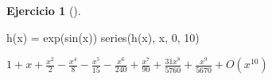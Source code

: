 \documentclass[
  a4paper,
]{scrreport}
\newenvironment{Shaded}{\begin{snugshade}}{\end{snugshade}}
\newcommand{\FloatTok}[1]{\textcolor[rgb]{0.68,0.00,0.00}{#1}}
\newcommand{\FunctionTok}[1]{\textcolor[rgb]{0.28,0.35,0.67}{#1}}
\newcommand{\NormalTok}[1]{\textcolor[rgb]{0.00,0.23,0.31}{#1}}
\newcommand{\OperatorTok}[1]{\textcolor[rgb]{0.37,0.37,0.37}{#1}}
\theoremstyle{definition}
\newtheorem{exercise}{Ejercicio}[chapter]
\theoremstyle{remark}
\begin{document}
\begin{exercise}[]
\begin{tcolorbox}
\begin{Shaded}
\begin{Highlighting}[]
\FunctionTok{h}\NormalTok{(x) }\OperatorTok{=} \FunctionTok{exp}\NormalTok{(}\FunctionTok{sin}\NormalTok{(x))}
\FunctionTok{series}\NormalTok{(}\FunctionTok{h}\NormalTok{(x), x, }\FloatTok{0}\NormalTok{, }\FloatTok{10}\NormalTok{)}
\end{Highlighting}
\end{Shaded}

$1 + x + \frac{x^{2}}{2} - \frac{x^{4}}{8} - \frac{x^{5}}{15} - \frac{x^{6}}{240} + \frac{x^{7}}{90} + \frac{31 x^{8}}{5760} + \frac{x^{9}}{5670} + O\left(x^{10}\right)$

\end{tcolorbox}

\end{exercise}
\end{document}
